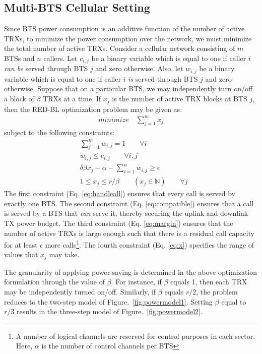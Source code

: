 \subsection{Multi-BTS Cellular Setting}
Since BTS power consumption is an additive function of the number of active TRXs, to minimize the power consumption over the network, we must minimize the total number of active TRXs.  Consider a cellular network consisting of $m$ BTSs and $n$ callers. 
Let $c_{i,j}$ be a binary variable which is equal to one if caller $i$ \textit{can be} served through BTS $j$ and zero otherwise.
Also, let $w_{i,j}$ be a binary variable which is equal to one if caller $i$ \textit{is} served through BTS $j$ and zero otherwise. Suppose that on a particular BTS, we may independently turn on/off a block of $\beta$ TRXs at a time.
If $x_j$ is the number of active TRX blocks at BTS $j$, then the RED-BL optimization problem may be given as: 
\begin{align}
\textit{minimize} \quad \sum_{j=1}^{m} x_j
\end{align}
subject to the following constraints: 
\begin{align}
& \sum_{j=1}^m w_{i,j} = 1 \qquad \forall i \label{eq:handleall}\\
& w_{i,j} \leq c_{i,j} \qquad \forall i, j \label{eq:compatible}\\
& \delta \beta x_j - \alpha - \sum_{i=1}^nw_{i,j} \geq \epsilon \label{eq:margin} \\
& 1 \leq x_j \leq r / \beta \qquad (x_j \in \mathbb{N}) \qquad \forall j \label{eq:x}
\end{align}
The first constraint (Eq. \ref{eq:handleall}) ensures that every call is served by exactly one BTS. The second constraint (Eq. \ref{eq:compatible}) ensures that a call is served by a BTS that \textit{can} serve it, thereby securing the uplink and downlink TX power budget.
The third constraint (Eq. \ref{eq:margin}) ensures that the number of active TRXs is large enough such that there is a residual call capacity for at least $\epsilon$ more calls\footnote{A number of logical channels are reserved for control purposes in each sector. Here, $\alpha$ is the number of control channels per BTS}.
The fourth constraint (Eq. \ref{eq:x}) specifies the range of values that $x_j$ may take.

The granularity of applying power-saving is determined in the above optimization formulation through the value of $\beta$. For instance, if $\beta$ equals 1, then each TRX may be independently turned on/off. Similarly, if $\beta$ equals $r/2$, the problem reduces to the two-step model of Figure.~\ref{fig:powermodel1}. Setting $\beta$ equal to $r/3$ results in the three-step model of Figure.~\ref{fig:powermodel2}.


